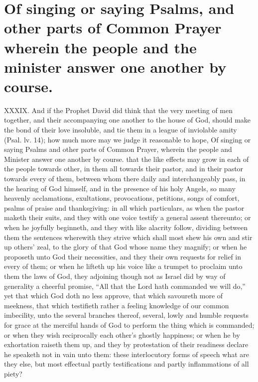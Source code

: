 \section*{Of singing or saying Psalms, and other parts of Common Prayer wherein the people and the minister answer one another by course.}
XXXIX. And if the Prophet David did think that the very meeting of men together, and their accompanying one another to the house of God, should make the bond of their love insoluble, and tie them in a league of inviolable amity (Psal. lv. 14); how much more may we judge it reasonable to hope,
Of singing or saying Psalms and other parts of Common Prayer, wherein the people and Minister answer one another by course.
 that the like effects may grow in each of the people towards other, in them all towards their pastor, and in their pastor towards every of them, between whom there daily and interchangeably pass, in the hearing of God himself, and in the presence of his holy Angels, so many heavenly acclamations, exultations, provocations, petitions, songs of comfort, psalms of praise and thanksgiving: in all which particulars, as when the pastor maketh their suits, and they with one voice testify a general assent thereunto; or when he joyfully beginneth, and they with like alacrity follow, dividing between them the sentences wherewith they strive which shall most shew his own and stir up others’ zeal, to the glory of that God whose name they magnify; or when he proposeth unto God their necessities, and they their own requests for relief in every of them; or when he lifteth up his voice like a trumpet to proclaim unto them the laws of God, they adjoining though not as Israel did by way of generality a cheerful promise, “All that the Lord hath commanded we will do,” yet that which God doth no less approve, that which savoureth more of meekness, that which testifieth rather a feeling knowledge of our common imbecility, unto the several  branches thereof, several,
 lowly and humble requests for grace at the merciful hands of God to perform the thing which is commanded; or when they wish reciprocally each other’s ghostly happiness; or when he by exhortation raiseth them up, and they by protestation of their readiness declare he speaketh not in vain unto them: these interlocutory forms of speech what are they else, but most effectual partly testifications and partly inflammations of all piety?

